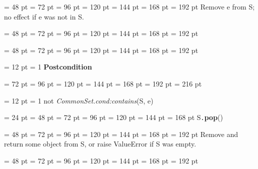 {{{{\par \noindent  \leftskip = 48 pt  \leftmargini = 72 pt  \leftmarginii = 96 pt  \leftmarginiii = 120 pt  \leftmarginiv = 144 pt  \leftmarginv = 168 pt  \leftmarginvi = 192 pt  Remove e from S; no effect if e was not in S.\par}
{\par \noindent  \leftskip = 48 pt  \leftmargini = 72 pt  \leftmarginii = 96 pt  \leftmarginiii = 120 pt  \leftmarginiv = 144 pt  \leftmarginv = 168 pt  \leftmarginvi = 192 pt {\par \noindent
\par}
\par}
{\par \noindent  \leftskip = 48 pt  \leftmargini = 72 pt  \leftmarginii = 96 pt  \leftmarginiii = 120 pt  \leftmarginiv = 144 pt  \leftmarginv = 168 pt  \leftmarginvi = 192 pt {\par \noindent
{\par \pagebreak[3.100000] \noindent \hangindent = 12 pt \hangafter = 1 
{\bf Postcondition\/}\par}
{\par \noindent  \leftskip = 72 pt  \leftmargini = 96 pt  \leftmarginii = 120 pt  \leftmarginiii = 144 pt  \leftmarginiv = 168 pt  \leftmarginv = 192 pt  \leftmarginvi = 216 pt {\par \noindent
{\par \pagebreak[3.000000] \noindent \hangindent = 12 pt \hangafter = 1 
not  {\em CommonSet.cond:contains\/}(S, e)\par}
\par}
\par}
\par}
\par}
\par}
\par}
{\par \noindent  \leftskip = 24 pt  \leftmargini = 48 pt  \leftmarginii = 72 pt  \leftmarginiii = 96 pt  \leftmarginiv = 120 pt  \leftmarginv = 144 pt  \leftmarginvi = 168 pt S{\tt .\/}{\bf {\large {\bf pop\/}}\/}(){\par \noindent
{\par \noindent  \leftskip = 48 pt  \leftmargini = 72 pt  \leftmarginii = 96 pt  \leftmarginiii = 120 pt  \leftmarginiv = 144 pt  \leftmarginv = 168 pt  \leftmarginvi = 192 pt  Remove and return some object from S, or raise ValueError if S was empty.\par}
{\par \noindent  \leftskip = 48 pt  \leftmargini = 72 pt  \leftmarginii = 96 pt  \leftmarginiii = 120 pt  \leftmarginiv = 144 pt  \leftmarginv = 168 pt  \leftmarginvi = 192 pt {\par \noindent
}}}}}
